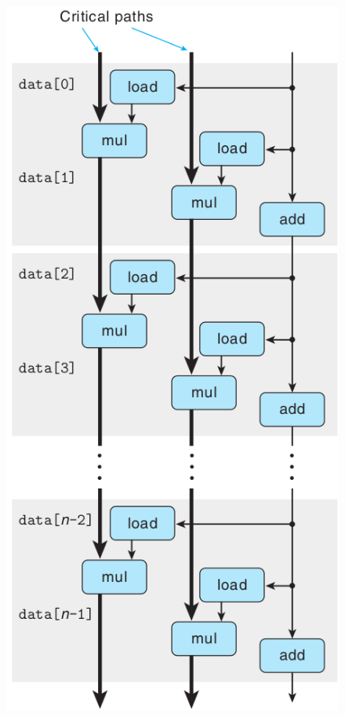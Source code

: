 \begin{figure}[!ht]
\begin{minipage}{0.33\textwidth}
        \includegraphics[width=\textwidth]{img/5-10}
    \end{minipage}
\end{figure}

